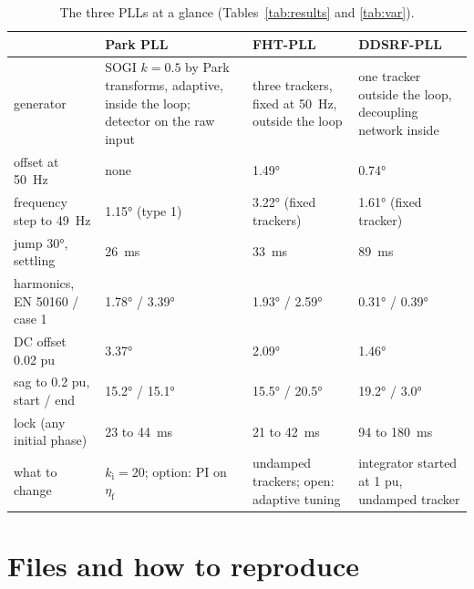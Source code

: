 \documentclass[11pt,a4paper]{scrartcl}
\newcommand{\ped}[1]{_{\mathrm{#1}}}
\begin{document}
\begin{onehalfspace}
\begin{table}[H]
	\centering
	\caption{The three PLLs at a glance (Tables~\ref{tab:results} and \ref{tab:var}).}
	\label{tab:summary}
	\footnotesize
	\begin{tabularx}{\textwidth}{@{} >{\raggedright\arraybackslash}p{} X X X @{}}
		\toprule
		& Park PLL & FHT-PLL & DDSRF-PLL \\
		\midrule
		generator & SOGI $k = 0.5$ by Park transforms, adaptive, inside the loop; detector on the raw input & three trackers, fixed at \SI{50}{\hertz}, outside the loop & one tracker outside the loop, decoupling network inside \\
		offset at \SI{50}{\hertz} & none & \ang{1.49} & \ang{0.74} \\
		frequency step to \SI{49}{\hertz} & \ang{1.15} (type 1) & \ang{3.22} (fixed trackers) & \ang{1.61} (fixed tracker) \\
		jump \ang{30}, settling & \SI{26}{\milli\second} & \SI{33}{\milli\second} & \SI{89}{\milli\second} \\
		harmonics, EN 50160 / case 1 & \ang{1.78} / \ang{3.39} & \ang{1.93} / \ang{2.59} & \ang{0.31} / \ang{0.39} \\
		DC offset \num{0.02} pu & \ang{3.37} & \ang{2.09} & \ang{1.46} \\
		sag to \num{0.2} pu, start / end & \ang{15.2} / \ang{15.1} & \ang{15.5} / \ang{20.5} & \ang{19.2} / \ang{3.0} \\
		lock (any initial phase) & \SI{23}{} to \SI{44}{\milli\second} & \SI{21}{} to \SI{42}{\milli\second} & \SI{94}{} to \SI{180}{\milli\second} \\
		what to change & $k\ped{i} = 20$; option: PI on $\eta\ped{f}$ & undamped trackers; open: adaptive tuning & integrator started at \num{1} pu, undamped tracker \\
		\bottomrule
	\end{tabularx}
\end{table}

\section{Files and how to reproduce}
\label{sec:files}


\end{onehalfspace}
\end{document}
